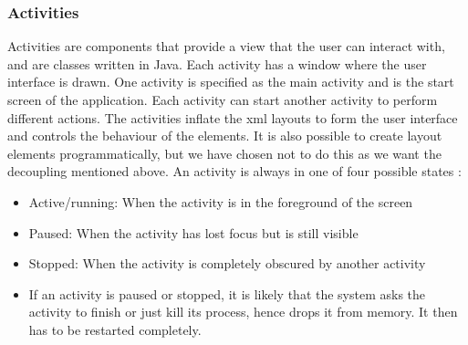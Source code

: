 \subsubsection{Activities}
Activities are components that provide a view that the user can interact with, and are classes written in Java. Each activity has a window where the user interface is drawn. One activity is specified as the main activity and is the start screen of the application. Each activity can start another activity to perform different actions. The activities inflate the \gls{xml} layouts to form the user interface and controls the behaviour of the elements. It is also possible to create layout elements programmatically, but we have chosen not to do this as we want the decoupling mentioned above.
\newline
\newline
An activity is always in one of four possible states \cite{bib:aas}:
\begin{itemize}
\item{}Active/running: When the activity is in the foreground of the screen
\item{}Paused: When the activity has lost focus but is still visible
\item{}Stopped: When the activity is completely obscured by another activity
\item{}If an activity is paused or stopped, it is likely that the system asks the activity to finish or just kill its process, hence drops it from memory. It then has to be restarted completely.
\end{itemize}

